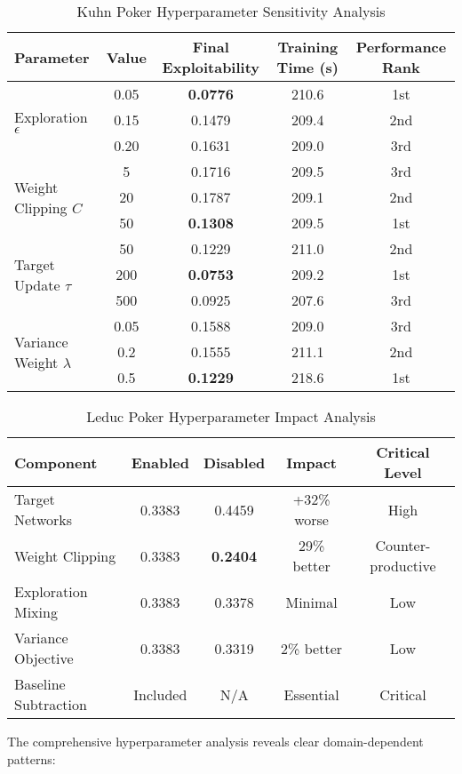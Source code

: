 \documentclass[12pt,a4paper]{article}
\begin{document}
\begin{table}[H]
\centering
\caption{Kuhn Poker Hyperparameter Sensitivity Analysis}
\begin{tabular}{@{}lcccc@{}}
\toprule
Parameter & Value & Final Exploitability & Training Time (s) & Performance Rank \\
\midrule
\multirow{3}{*}{Exploration $\epsilon$} 
& 0.05 & \textbf{0.0776} & 210.6 & 1st \\
& 0.15 & 0.1479 & 209.4 & 2nd \\
& 0.20 & 0.1631 & 209.0 & 3rd \\
\midrule
\multirow{3}{*}{Weight Clipping $C$} 
& 5 & 0.1716 & 209.5 & 3rd \\
& 20 & 0.1787 & 209.1 & 2nd \\
& 50 & \textbf{0.1308} & 209.5 & 1st \\
\midrule
\multirow{3}{*}{Target Update $\tau$} 
& 50 & 0.1229 & 211.0 & 2nd \\
& 200 & \textbf{0.0753} & 209.2 & 1st \\
& 500 & 0.0925 & 207.6 & 3rd \\
\midrule
\multirow{3}{*}{Variance Weight $\lambda$} 
& 0.05 & 0.1588 & 209.0 & 3rd \\
& 0.2 & 0.1555 & 211.1 & 2nd \\
& 0.5 & \textbf{0.1229} & 218.6 & 1st \\
\bottomrule
\end{tabular}
\end{table}

\begin{table}[H]
\centering
\caption{Leduc Poker Hyperparameter Impact Analysis}
\begin{tabular}{@{}lcccc@{}}
\toprule
Component & Enabled & Disabled & Impact & Critical Level \\
\midrule
Target Networks & 0.3383 & 0.4459 & +32\% worse & High \\
Weight Clipping & 0.3383 & \textbf{0.2404} & 29\% better & Counter-productive \\
Exploration Mixing & 0.3383 & 0.3378 & Minimal & Low \\
Variance Objective & 0.3383 & 0.3319 & 2\% better & Low \\
Baseline Subtraction & Included & N/A & Essential & Critical \\
\bottomrule
\end{tabular}
\end{table}

The comprehensive hyperparameter analysis reveals clear domain-dependent patterns:
\end{document}

